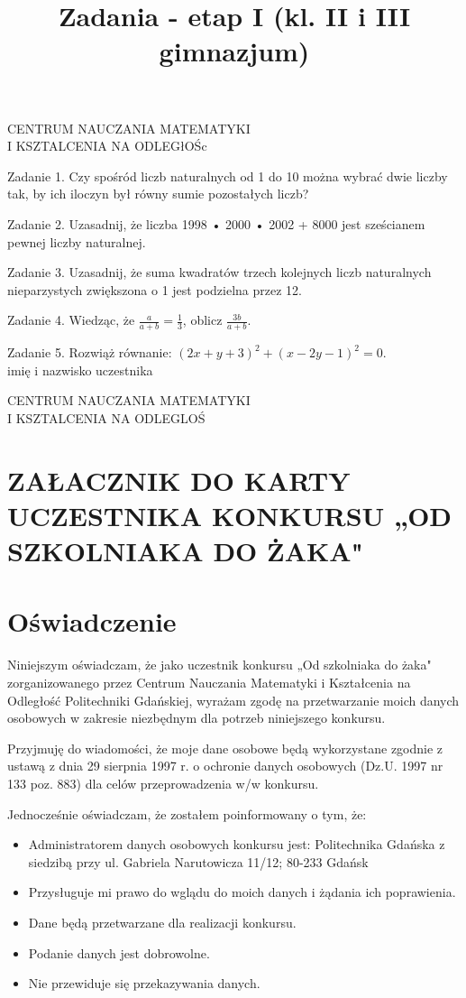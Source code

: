 \documentclass[10pt]{article}
\title{Zadania - etap I (kl. II i III gimnazjum) }
\author{}
\date{}
\begin{document}
\maketitle
CENTRUM NAUCZANIA MATEMATYKI\\
I KSZTALCENIA NA ODLEGłOŚc

Zadanie 1. Czy spośród liczb naturalnych od 1 do 10 można wybrać dwie liczby tak, by ich iloczyn był równy sumie pozostałych liczb?

Zadanie 2. Uzasadnij, że liczba 1998 • 2000 • 2002 + 8000 jest sześcianem pewnej liczby naturalnej.

Zadanie 3. Uzasadnij, że suma kwadratów trzech kolejnych liczb naturalnych nieparzystych zwiększona o 1 jest podzielna przez 12.

Zadanie 4. Wiedząc, że \(\frac{a}{a+b}=\frac{1}{3}\), oblicz \(\frac{3 b}{a+b}\).

Zadanie 5. Rozwiąż równanie: \((2 x+y+3)^{2}+(x-2 y-1)^{2}=0\).\\
imię i nazwisko uczestnika

CENTRUM NAUCZANIA MATEMATYKI\\
I KSZTALCENIA NA ODLEGLOŚ\\
\(\qquad\)

\section*{ZAŁACZNIK DO KARTY UCZESTNIKA KONKURSU „OD SZKOLNIAKA DO ŻAKA"}
\section*{Oświadczenie}
Niniejszym oświadczam, że jako uczestnik konkursu „Od szkolniaka do żaka" zorganizowanego przez Centrum Nauczania Matematyki i Kształcenia na Odległość Politechniki Gdańskiej, wyrażam zgodę na przetwarzanie moich danych osobowych w zakresie niezbędnym dla potrzeb niniejszego konkursu.

Przyjmuję do wiadomości, że moje dane osobowe będą wykorzystane zgodnie z ustawą z dnia 29 sierpnia 1997 r. o ochronie danych osobowych (Dz.U. 1997 nr 133 poz. 883) dla celów przeprowadzenia w/w konkursu.

Jednocześnie oświadczam, że zostałem poinformowany o tym, że:

\begin{itemize}
  \item Administratorem danych osobowych konkursu jest: Politechnika Gdańska z siedzibą przy ul. Gabriela Narutowicza 11/12; 80-233 Gdańsk
  \item Przysługuje mi prawo do wglądu do moich danych i żądania ich poprawienia.
  \item Dane będą przetwarzane dla realizacji konkursu.
  \item Podanie danych jest dobrowolne.
  \item Nie przewiduje się przekazywania danych.
\end{itemize}
\end{document}
